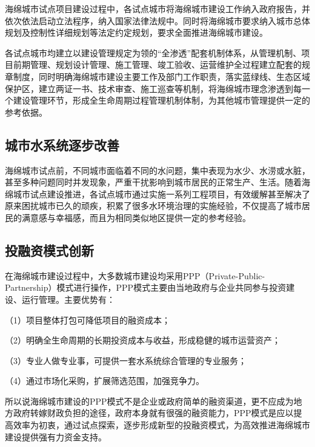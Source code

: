 \documentclass[
]{book}
\begin{document}
海绵城市试点项目建设过程中，各试点城市将海绵城市建设工作纳入政府报告，并依次依法启动立法程序，纳入国家法律法规中。同时将海绵城市要求纳入城市总体规划及控制性详细规划等法定约定规划，要求全面推进海绵城市建设。

各试点城市均建立以建设管理规定为领的``全渗透''配套机制体系，从管理机制、项目前期管理、规划设计管理、施工管理、竣工验收、运营维护全过程建立配套的规章制度，同时明确海绵城市建设主要工作及部门工作职责，落实蓝绿线、生态区域保护区，建立两证一书、技术审查、施工巡查等机制，将海绵城市理念渗透到每一个建设管理环节，形成全生命周期过程管理机制体制，为其他城市管理提供一定的参考依据。

\hypertarget{ux57ceux5e02ux6c34ux7cfbux7edfux9010ux6b65ux6539ux5584}{%
\subsection{城市水系统逐步改善}\label{ux57ceux5e02ux6c34ux7cfbux7edfux9010ux6b65ux6539ux5584}}

海绵城市试点前，不同城市面临着不同的水问题，集中表现为水少、水涝或水脏，甚至多种问题同时并发现象，严重干扰影响到城市居民的正常生产、生活。随着海绵城市试点建设推进，各试点城市通过实施一系列工程项目，有效缓解甚至解决了原来困扰城市已久的顽疾，积累了很多水环境治理的实施经验，不仅提高了城市居民的满意感与幸福感，而且为相同类似地区提供一定的参考经验。

\hypertarget{ux6295ux878dux8d44ux6a21ux5f0fux521bux65b0}{%
\subsection{投融资模式创新}\label{ux6295ux878dux8d44ux6a21ux5f0fux521bux65b0}}

在海绵城市建设过程中，大多数城市建设均采用PPP（Private-Public-Partnership）模式进行操作，PPP模式主要由当地政府与企业共同参与投资建设、运行管理。主要优势有：

（1）项目整体打包可降低项目的融资成本；

（2）明确全生命周期的长期投资成本与收益，形成稳健的城市运营资产；

（3）专业人做专业事，可提供一套水系统综合管理的专业服务；

（4）通过市场化采购，扩展筛选范围，加强竞争力。

所以说海绵城市建设的PPP模式不是企业或政府简单的融资渠道，更不应成为地方政府转嫁财政负担的途径，政府本身就有很强的融资能力，PPP模式是应以提高效率为初衷，通过试点探索，逐步形成新型的投融资模式，为高效推进海绵城市建设提供强有力资金支持。
\end{document}
